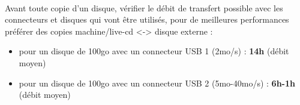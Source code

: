 \documentclass[a4paper,11pt]{article}				    %
\begin{document}
{{
}
}
{
\\Avant toute copie d'un disque, v\'erifier le d\'ebit de transfert possible avec les connecteurs et disques qui vont \^etre utilis\'es, pour de meilleures performances pr\'ef\'erer des copies machine/live-cd <-> disque externe : 
\begin{itemize}
	\item pour un disque de 100go avec un connecteur USB 1 (2mo/s) : \textbf{14h} (d\'ebit moyen)
	\item pour un disque de 100go avec un connecteur USB 2 (5mo-40mo/s) : \textbf{6h-1h} (d\'ebit moyen)
\end{itemize}
}
\end{document}
